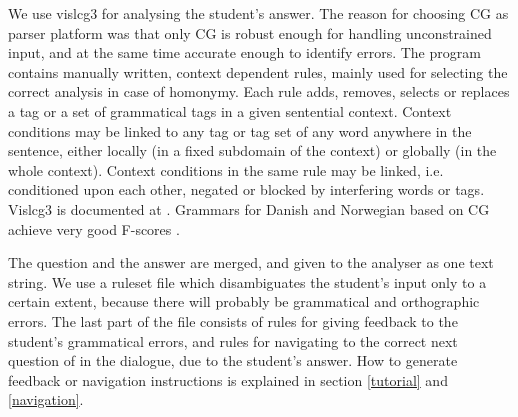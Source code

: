 \documentclass[11pt]{article}
\begin{document}

We use vislcg3 for analysing the student's answer. The reason for choosing CG as parser platform was that only CG is robust enough for handling unconstrained input, and at the same time accurate enough to identify errors. The program contains manually written, context dependent rules, mainly used for selecting the correct analysis in case of homonymy. Each rule adds, removes, selects or replaces a tag or a set of grammatical tags in a given sentential context. Context conditions may be linked to any tag or tag set of any word anywhere in the sentence, either locally (in a fixed subdomain of the context) or globally (in the whole context). Context conditions in the same rule may be linked, i.e. conditioned upon each other, negated or blocked by interfering words or tags. Vislcg3 is documented at \cite{Visl:08}. Grammars for Danish and Norwegian based on CG achieve very good F-scores \cite{Bick:04}.

The question and the answer are merged, and given to the analyser as one text string. We use a ruleset file which disambiguates the student's input only to a certain extent, because there will probably be grammatical and orthographic errors. The last part of the file consists of rules for giving feedback to the student's grammatical errors, and rules for navigating to the correct next question of in the dialogue, due to the student's answer. How to generate feedback or navigation instructions is explained in section \ref{tutorial} and \ref{navigation}.
\end{document}
